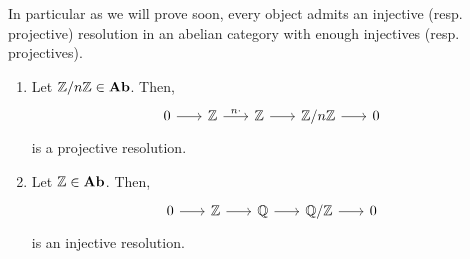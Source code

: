 \documentclass[../main.tex]{subfiles}
\begin{document}
In particular as we will prove soon, every object admits an injective (resp. projective) resolution in an abelian category with enough injectives (resp. projectives).

\begin{exmps} \leavevmode
    \begin{enumerate}
        \item Let $\mathbb{Z} / n\mathbb{Z} \in \mathbf{Ab}$. Then,
        \[\begin{tikzcd}[column sep=scriptsize]
            0 \ar[r] & \bb Z \ar[r, "n\cdot"] & \bb Z \ar[r] & \bb Z/ n\bb Z \ar[r] & 0
        \end{tikzcd}\]
        is a projective resolution.
        \item Let $\mathbb{Z} \in\mathbf{Ab}$. Then,
        \[\begin{tikzcd}[column sep=scriptsize]
            0\ar[r] & \bb Z \ar[r] & \bb Q \ar[r] & \bb Q / \bb Z \ar[r] & 0
        \end{tikzcd}\]
        is an injective resolution.
    \end{enumerate}
\end{exmps}
\end{document}
